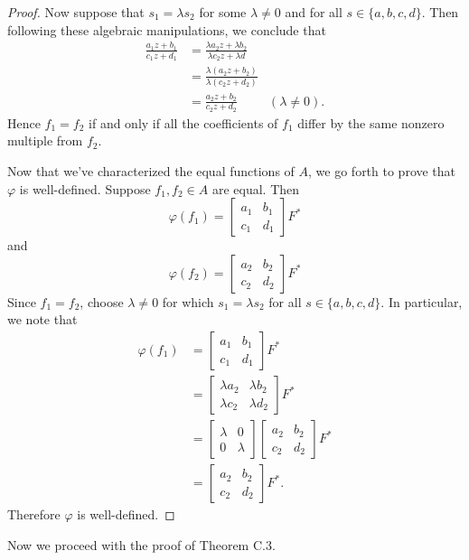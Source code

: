 \documentclass[12pt]{article}
\newcommand{\lftmat}[4]{\begin{bmatrix} {#1} & {#2} \\ {#3} & {#4} \end{bmatrix}}
\theoremstyle{plain}
\theoremstyle{definition}
\begin{document}
\begin{appendices}
\begin{proof}
	Now suppose that $s_1 = \lambda s_2$ for some $\lambda\neq 0$ and for all $s\in\{a,b,c,d\}$. Then following these algebraic manipulations, we conclude that
	\begin{align*}
		\frac{a_1z + b_1}{c_1z + d_1} & = \frac{\lambda a_2z + \lambda b_2}{\lambda c_2z + \lambda d}\\
		& = \frac{\lambda(a_2z + b_2)}{\lambda(c_2z + d_2)}\\
		& = \frac{a_2z + b_2}{c_2z + d_2} & (\lambda \neq 0).
	\end{align*}
	Hence $f_1 = f_2$ if and only if all the coefficients of $f_1$ differ by the same nonzero multiple from $f_2$.
	
	Now that we've characterized the equal functions of $A$, we go forth to prove that $\varphi$ is well-defined. Suppose $f_1,f_2\in A$ are equal. Then
	\[
		\varphi(f_1) = \lftmat{a_1}{b_1}{c_1}{d_1} F^*
	\]
	and 
	\[
		\varphi(f_2) = \lftmat{a_2}{b_2}{c_2}{d_2} F^*
	\]
	Since $f_1 = f_2$, choose $\lambda\neq 0$ for which $s_1 = \lambda s_2$ for all $s\in\{a,b,c,d\}$. In particular, we note that
	\begin{align*}
		\varphi(f_1) & = \lftmat{a_1}{b_1}{c_1}{d_1} F^*\\
		& = \lftmat{\lambda a_2}{\lambda b_2}{\lambda c_2}{\lambda d_2} F^*\\
		& = \lftmat{\lambda}{0}{0}{\lambda}\lftmat{a_2}{b_2}{c_2}{d_2} F^*\\
		& = \lftmat{a_2}{b_2}{c_2}{d_2} F^*.
	\end{align*}
	Therefore $\varphi$ is well-defined.
\end{proof}
	
Now we proceed with the proof of Theorem C.3.	
	

\end{appendices}
\end{document}
